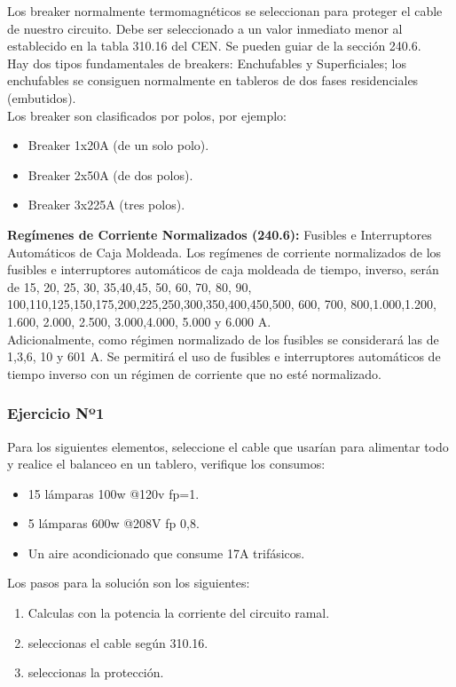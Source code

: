 \documentclass[11pt,letterpaper]{article}
\begin{document}
Los breaker normalmente termomagnéticos se seleccionan para proteger el cable de nuestro circuito. Debe ser seleccionado a un valor inmediato menor al establecido en la tabla 310.16 del CEN. Se pueden guiar de la sección 240.6.\\

Hay dos tipos fundamentales de breakers: Enchufables y Superficiales; los enchufables se consiguen normalmente en tableros de dos fases residenciales (embutidos).\\

Los breaker son clasificados por polos, por ejemplo:

\begin{itemize}
	\item Breaker 1x20A (de un solo polo).
	\item Breaker 2x50A (de dos polos).
	\item Breaker 3x225A (tres polos).
\end{itemize}

	\textbf{Regímenes de Corriente Normalizados (240.6):} Fusibles e Interruptores Automáticos de Caja Moldeada. Los regímenes de corriente normalizados de los fusibles e interruptores automáticos de caja moldeada de tiempo, inverso, serán de 15, 20, 25, 30, 35,40,45, 50, 60, 70, 80, 90, 100,110,125,150,175,200,225,250,300,350,400,450,500, 600, 700, 800,1.000,1.200, 1.600, 2.000, 2.500, 3.000,4.000, 5.000 y 6.000 A.\\
	Adicionalmente, como régimen normalizado de los fusibles se considerará las de 1,3,6, 10 y 601 A. Se permitirá el uso de fusibles e interruptores automáticos de tiempo inverso con un régimen de corriente que no esté normalizado.

\subsubsection{Ejercicio Nº1}

Para los siguientes elementos, seleccione el cable que usarían para alimentar todo y realice el balanceo en un tablero, verifique los consumos:

\begin{itemize}
	\item 15 lámparas 100w @120v fp=1.
	\item 5 lámparas 600w @208V fp 0,8.
	\item Un aire acondicionado que consume 17A trifásicos.
\end{itemize}
Los pasos para la solución son los siguientes:
\begin{enumerate}
	\item Calculas con la potencia la corriente del circuito ramal.

	\item seleccionas el cable según 310.16.

	\item seleccionas la protección.
\end{enumerate}
\end{document}
